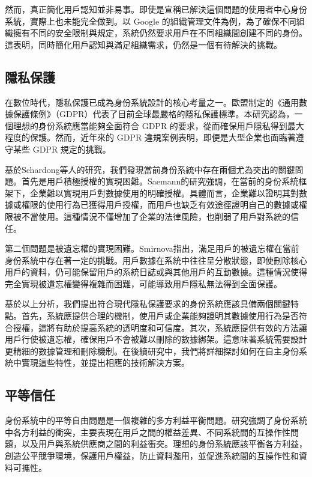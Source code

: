 然而，真正簡化用戶認知並非易事。即使是宣稱已解決這個問題的使用者中心身份系統，實際上也未能完全做到。以 Google 的組織管理文件\cite{gcp2024identity}為例，為了確保不同組織擁有不同的安全限制與規定，系統仍然要求用戶在不同組織間創建不同的身份。這表明，同時簡化用戶認知與滿足組織需求，仍然是一個有待解決的挑戰。
\subsection{隱私保護}
在數位時代，隱私保護已成為身份系統設計的核心考量之一。歐盟制定的《通用數據保護條例》（GDPR）\cite{GDPR2016}代表了目前全球最嚴格的隱私保護標準。本研究認為，一個理想的身份系統應當能夠全面符合 GDPR 的要求，從而確保用戶隱私得到最大程度的保護。然而，近年來的 GDPR 違規案例表明，即便是大型企業也面臨著遵守某些 GDPR 規定的挑戰。

基於Schardong等人的研究\cite{s22155641}，我們發現當前身份系統中存在兩個尤為突出的關鍵問題。首先是用戶積極授權的實現困難。Saemann\cite{saemann2022investigating}的研究強調，在當前的身份系統框架下，企業難以實現用戶對數據使用的明確授權。具體而言，企業難以證明其對數據或權限的使用行為已獲得用戶授權，而用戶也缺乏有效途徑證明自己的數據或權限被不當使用。這種情況不僅增加了企業的法律風險，也削弱了用戶對系統的信任。

第二個問題是被遺忘權的實現困難。Smirnova\cite{smirnova2024understanding}指出，滿足用戶的被遺忘權在當前身份系統中存在著一定的挑戰。用戶數據在系統中往往呈分散狀態，即使刪除核心用戶的資料，仍可能保留用戶的系統日誌或與其他用戶的互動數據。這種情況使得完全實現被遺忘權變得複雜而困難，可能導致用戶隱私無法得到全面保護。

基於以上分析，我們提出符合現代隱私保護要求的身份系統應該具備兩個關鍵特點。首先，系統應提供合理的機制，使用戶或企業能夠證明其數據使用行為是否符合授權，這將有助於提高系統的透明度和可信度。其次，系統應提供有效的方法讓用戶行使被遺忘權，確保用戶不會被難以刪除的數據綁架。這意味著系統需要設計更精細的數據管理和刪除機制。在後續研究中，我們將詳細探討如何在自主身份系統中實現這些特性，並提出相應的技術解決方案。
\subsection{平等信任}
身份系統中的平等自由問題是一個複雜的多方利益平衡問題。研究\cite{preukschat2021self}強調了身份系統中各方利益的衝突，主要表現在用戶之間的權益差異、不同系統間的互操作性問題，以及用戶與系統供應商之間的利益衝突。理想的身份系統應該平衡各方利益，創造公平競爭環境，保護用戶權益，防止資料濫用，並促進系統間的互操作性和資料可攜性。

